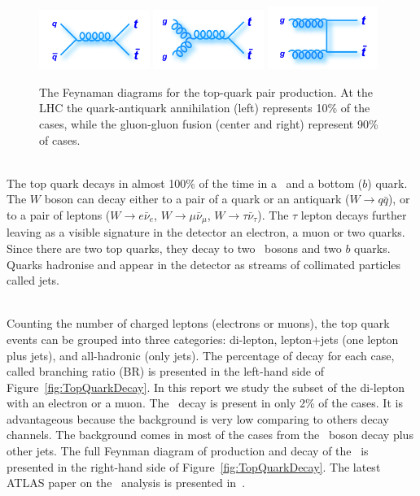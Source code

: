\begin{figure}[h]
  \centering
  \includegraphics[width=0.32\textwidth]{../presentation/plots/ttbar_1.png}
  \includegraphics[width=0.32\textwidth]{../presentation/plots/ttbar_2.png}
  \includegraphics[width=0.32\textwidth]{../presentation/plots/ttbar_3.png}
  \caption{The Feynaman diagrams for the top-quark pair production. At the LHC the quark-antiquark annihilation (left) represents 10\% of the cases, while the gluon-gluon fusion (center and right) represent 90\% of cases.}
  \label{fig:TopQuarkFeynmanDiagrams}
\end{figure}

\ \\The top quark decays in almost 100\% of the time in a \Wboson~and a bottom ($b$) quark. The $W$ boson can decay either to a pair of a quark or an antiquark ($W\rightarrow q\bar{q}$), or to a pair of leptons ($W \rightarrow e\bar{\nu}_e$, $W \rightarrow \mu\bar{\nu}_\mu$, $W \rightarrow \tau\bar{\nu}_\tau$). The $\tau$ lepton decays further leaving as a visible signature in the detector an electron, a muon or two quarks. Since there are two top quarks, they decay to two \Wboson~bosons and two $b$ quarks. Quarks hadronise and appear in the detector as streams of collimated particles called jets. 

\ \\Counting the number of charged leptons (electrons or muons), the top quark events can be grouped into three categories: di-lepton, lepton+jets (one lepton plus jets), and all-hadronic (only jets). The percentage of decay for each case, called branching ratio (BR) is presented in the left-hand side of Figure~\ref{fig:TopQuarkDecay}. In this report we study the subset of the di-lepton with an electron or a muon. The \ttbaremu~decay is present in only 2\% of the cases. It is advantageous because the background is very low comparing to others decay channels. The background comes in most of the cases from the \Zboson~boson decay plus other jets. The full Feynman diagram of production and decay of the \ttbaremu~is presented in the right-hand side of Figure~\ref{fig:TopQuarkDecay}. The latest ATLAS paper on the \ttbaremu~analysis is presented in~\cite{ttbaremu}.

